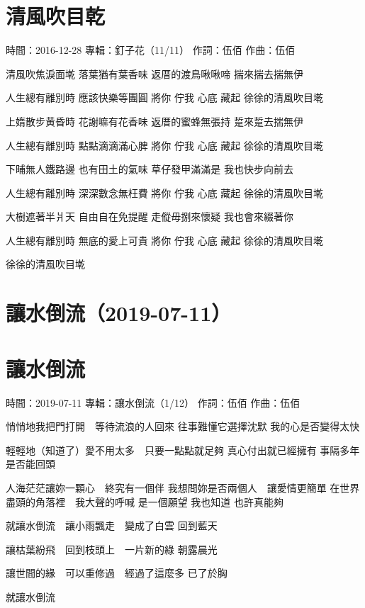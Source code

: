 \documentclass[UTF8,a4paper,oneside,twocolumn,12pt]{ctexbook}
\newcommand{\infopair}[2]{\textbullet #1：#2}
\newcommand{\zc}[1][伍佰]{\infopair{作詞}{#1}}
\newcommand{\zq}[1][伍佰]{\infopair{作曲}{#1}}
\newcommand{\zj}[1]{\infopair{專輯}{#1}}
\newcommand{\sj}[1]{\infopair{時間}{#1}}
\newenvironment{info}{\begin{flushleft}\kaishu
	}
	{\end{flushleft}\normalsize\yahei\par}
\newenvironment{lyric}{
	}
{}
\begin{document}
\section{清風吹目乾}
\begin{info}
	\sj{2016-12-28}
	\zj{釘子花（11/11）}
	\zc
	\zq
\end{info}
\begin{lyric}
	清風吹焦淚面墘
	落葉猶有葉香味
	返厝的渡鳥啾啾啼
	揣來揣去揣無伊

	人生總有離別時
	應該快樂等團圓
	將你 佇我 心底 藏起
	徐徐的清風吹目墘

	上媠散步黄昏時
	花謝嘛有花香味
	返厝的蜜蜂無張持
	踅來踅去揣無伊

	人生總有離別時
	點點滴滴滿心脾
	將你 佇我 心底 藏起
	徐徐的清風吹目墘

	下晡無人鐵路邊
	也有田土的氣味
	草仔發甲滿滿是
	我也快步向前去

	人生總有離別時
	深深數念無枉費
	將你 佇我 心底 藏起
	徐徐的清風吹目墘

	大樹遮著半爿天
	自由自在免提醒
	走傱毋捌來懷疑
	我也會來綴著你

	人生總有離別時
	無底的愛上可貴
	將你 佇我 心底 藏起
	徐徐的清風吹目墘

	徐徐的清風吹目墘
\end{lyric}

\section*{讓水倒流（2019-07-11）}
\section{讓水倒流}
\begin{info}
	\sj{2019-07-11}
	\zj{讓水倒流（1/12）}
	\zc
	\zq
\end{info}
\begin{lyric}
	悄悄地我把門打開　等待流浪的人回來
	往事難懂它選擇沈默
	我的心是否變得太快

	輕輕地（知道了）愛不用太多　只要一點點就足夠
	真心付出就已經擁有
	事隔多年是否能回頭

	人海茫茫讓妳一顆心　終究有一個伴
	我想問妳是否兩個人　讓愛情更簡單
	在世界盡頭的角落裡　我大聲的呼喊
	是一個願望 我也知道 也許真能夠

	就讓水倒流　讓小雨飄走　變成了白雲
	回到藍天

	讓枯葉紛飛　回到枝頭上　一片新的綠
	朝露晨光

	讓世間的緣　可以重修過　經過了這麼多
	已了於胸

	就讓水倒流
\end{lyric}
\end{document}

